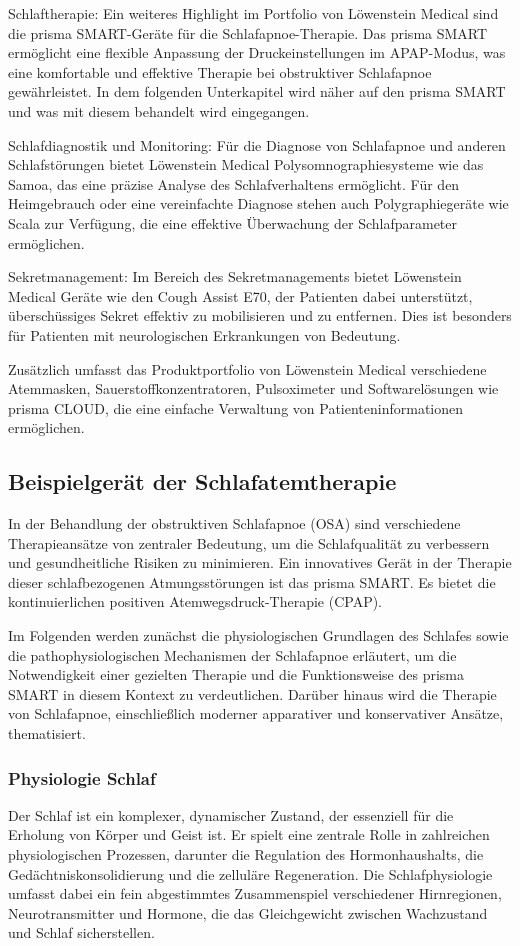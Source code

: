 \documentclass[a4paper, 12pt]{article}
\begin{document}
Schlaftherapie:
Ein weiteres Highlight im Portfolio von Löwenstein Medical sind die prisma SMART-Geräte für die Schlafapnoe-Therapie. Das prisma SMART ermöglicht eine flexible Anpassung der Druckeinstellungen im APAP-Modus, was eine komfortable und effektive Therapie bei obstruktiver Schlafapnoe gewährleistet. In dem folgenden Unterkapitel wird näher auf den prisma SMART und was mit diesem behandelt wird eingegangen.

Schlafdiagnostik und Monitoring:
Für die Diagnose von Schlafapnoe und anderen Schlafstörungen bietet Löwenstein Medical Polysomnographiesysteme wie das Samoa, das eine präzise Analyse des Schlafverhaltens ermöglicht. Für den Heimgebrauch oder eine vereinfachte Diagnose stehen auch Polygraphiegeräte wie Scala zur Verfügung, die eine effektive Überwachung der Schlafparameter ermöglichen.

Sekretmanagement:
Im Bereich des Sekretmanagements bietet Löwenstein Medical Geräte wie den Cough Assist E70, der Patienten dabei unterstützt, überschüssiges Sekret effektiv zu mobilisieren und zu entfernen. Dies ist besonders für Patienten mit neurologischen Erkrankungen von Bedeutung.

Zusätzlich umfasst das Produktportfolio von Löwenstein Medical verschiedene Atemmasken, Sauerstoffkonzentratoren, Pulsoximeter und Softwarelösungen wie prisma CLOUD, die eine einfache Verwaltung von Patienteninformationen ermöglichen.

\newpage
\subsection{Beispielgerät der Schlafatemtherapie}\label{prismaSmart}
In der Behandlung der obstruktiven Schlafapnoe (OSA) sind verschiedene Therapieansätze von zentraler Bedeutung, um die Schlafqualität zu verbessern und gesundheitliche Risiken zu minimieren. Ein innovatives Gerät in der Therapie dieser schlafbezogenen Atmungsstörungen ist das prisma SMART. Es bietet die kontinuierlichen positiven Atemwegsdruck-Therapie (CPAP). 

Im Folgenden werden zunächst die physiologischen Grundlagen des Schlafes sowie die pathophysiologischen Mechanismen der Schlafapnoe erläutert, um die Notwendigkeit einer gezielten Therapie und die Funktionsweise des prisma SMART in diesem Kontext zu verdeutlichen. Darüber hinaus wird die Therapie von Schlafapnoe, einschließlich moderner apparativer und konservativer Ansätze, thematisiert.

\subsubsection{Physiologie Schlaf}
Der Schlaf ist ein komplexer, dynamischer Zustand, der essenziell für die Erholung von Körper und Geist ist. Er spielt eine zentrale Rolle in zahlreichen physiologischen Prozessen, darunter die Regulation des Hormonhaushalts, die Gedächtniskonsolidierung und die zelluläre Regeneration. Die Schlafphysiologie umfasst dabei ein fein abgestimmtes Zusammenspiel verschiedener Hirnregionen, Neurotransmitter und Hormone, die das Gleichgewicht zwischen Wachzustand und Schlaf sicherstellen.
\end{document}
